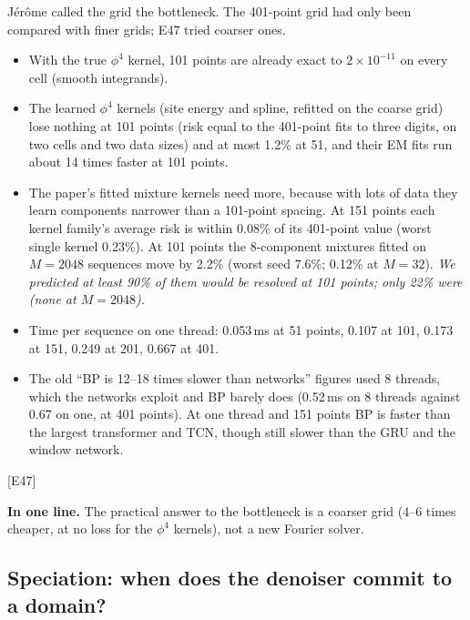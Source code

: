 \documentclass[11pt,a4paper]{article}
\newcommand{\key}[1]{\par\smallskip\noindent\colorbox{soft}{\parbox{\dimexpr\linewidth-2\fboxsep}{\small\textbf{In one line.} #1}}\par\smallskip}
\newcommand{\src}[1]{{\footnotesize\color{gray}[#1]}}
\newcommand{\fals}[1]{{\small\itshape #1}}
\begin{document}
Jérôme called the grid the bottleneck. The 401-point grid had only been compared with finer grids; E47 tried coarser ones.
\begin{itemize}
\item With the true $\phi^4$ kernel, 101 points are already exact to $2\times10^{-11}$ on every cell (smooth integrands).
\item The learned $\phi^4$ kernels (site energy and spline, refitted on the coarse grid) lose nothing at 101 points (risk equal to the
401-point fits to three digits, on two cells and two data sizes) and at most 1.2\% at 51, and their EM fits run about 14 times faster
at 101 points.
\item The paper's fitted mixture kernels need more, because with lots of data they learn components narrower than a 101-point spacing. At 151 points each kernel family's average risk is within 0.08\% of its
401-point value (worst single kernel 0.23\%). At 101 points the 8-component mixtures fitted on $M=2048$ sequences move by 2.2\% (worst
seed 7.6\%; 0.12\% at $M=32$). \fals{We predicted at least 90\% of them
would be resolved at 101 points; only 22\% were (none at $M=2048$).}
\item Time per sequence on one thread: 0.053\,ms at 51 points, 0.107 at 101, 0.173 at 151, 0.249 at 201, 0.667 at 401.
\item The old ``BP is 12--18 times slower than networks'' figures used 8 threads, which the networks exploit and BP barely does (0.52\,ms
on 8 threads against 0.67 on one, at 401 points). At one thread and 151 points BP is faster than the largest transformer and TCN,
though still slower than the GRU and the window network.
\end{itemize}
\src{E47}

\key{The practical answer to the bottleneck is a coarser grid (4--6 times cheaper, at no loss for the $\phi^4$ kernels), not a new Fourier solver.}

\subsection{Speciation: when does the denoiser commit to a domain?}
\end{document}
